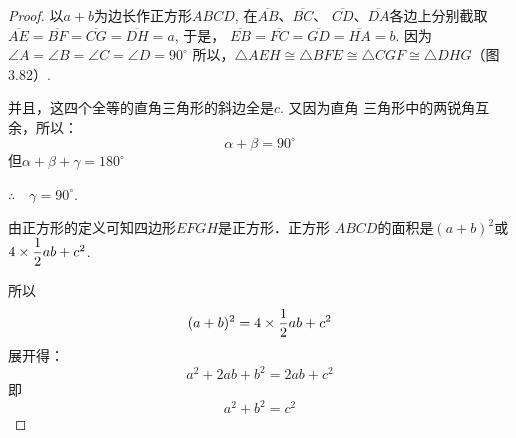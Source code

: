 \begin{proof}
    以$a+b$为边长作正方形$ABCD$, 在$\overline{AB}$、$\overline{BC}$、
$\overline{CD}$、$\overline{DA}$各边上分别截取$\overline{AE}=\overline{BF}=\overline{CG}=\overline{DH}=a$, 于是，
$\overline{EB}=\overline{FC}=\overline{GD}=\overline{HA}=b$. 因为$\angle A=\angle B=\angle C=\angle D=90^{\circ}$
所以，$\triangle AEH\cong \triangle BFE\cong \triangle CGF\cong \triangle DHG$（图3.82）.

并且，这四个全等的直角三角形的斜边全是$c$. 又因为直角
三角形中的两锐角互余，所以：
\[\alpha+\beta=90^{\circ}\]
但$\alpha+\beta+\gamma=180^{\circ}$

$\therefore\quad \gamma=90^{\circ}$.

由正方形的定义可知四边形$EFGH$是正方形．正方形
$ABCD$的面积是$(a+b)^2$或$4\times\dfrac{1}{2}ab+c^2$.

所以
\[(a+b)^2=4\times\dfrac{1}{2}ab+c^2\]
展开得：\[a^2+2ab+b^2=2ab+c^2\]
即
\[a^2+b^2=c^2\]
\end{proof}

